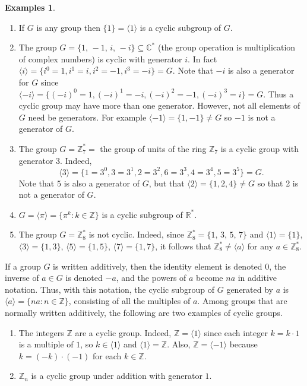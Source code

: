 \documentclass[11pt]{article}
\newcommand{\R}{\mathbb R}
\newcommand{\cm} {{\mathbb C}}
\newcommand{\Z} {{\mathbb Z}}
\newcommand{\<}{\ensuremath{\langle}}
\renewcommand{\>}{\ensuremath{\rangle}}
\theoremstyle{plain}
\theoremstyle{definition}
\newtheorem{exs}[thm]{Examples}
\begin{document}
\begin{exs}  \begin{enumerate}
\item If $G$ is any group  then
$\{1\} =\langle 1\rangle$ is a cyclic subgroup of $G$.

\item  The group $G=\{1,\, -1,\, i,\, -i\} \subseteq \cm^*$ (the
group operation  is multiplication of complex numbers) is cyclic
with generator $i$.  In fact $\langle i\rangle = \{i^0=1, i^1=i,
i^2=-1, i^3=-i\} = G$.  Note that $-i$ is also a generator for $G$
since $\langle -i\rangle =\{(-i)^0=1, (-i)^1=-i, (-i)^2=-1,
(-i)^3=i\}=G$.  Thus a cyclic group may have more than one
generator.  However, not all elements of $G$ need be generators.
For example $\langle -1\rangle = \{1, -1\}\ne G$ so $-1$ is not a
generator of $G$.

\item The group $G=\Z_7^*=$ the group of units of the ring $\Z_7$ is
a cyclic group with generator $3$.  Indeed,
$$\langle 3\rangle = \{ 1=3^0, 3=3^1, 2=3^2, 6=3^3, 4=3^4, 5=3^5\}=G.$$
Note that $5$ is also a generator of $G$, but that
$\langle 2\rangle = \{1, 2, 4\}\ne G$ so that 2 is not a generator of $G$.

\item  $G=\langle \pi\rangle =\{\pi^k:k\in \Z\}$ is a cyclic
subgroup of $\R^*$.

\item  The group $G=\Z_8^*$ is not cyclic.  Indeed, since
$\Z_8^*=\{1, \, 3,\, 5,\,7\}$ and $\langle 1\rangle = \{1\}$,
$\langle 3\rangle = \{1, 3\}$, $\langle 5\rangle=\{1, 5\}$,
$\langle 7\rangle =\{1, 7\}$, it follows that $\Z_8^*\ne \langle
a\rangle$ for any $a\in \Z_8^*$.
\end{enumerate}
\medskip
If a group $G$ is written additively, then the identity
element is denoted $0$,   the inverse of $a\in G$ is denoted $-a$,
and the powers of $a$ become $na$ in additive notation.  Thus,
with this notation, the cyclic subgroup of $G$ generated by $a$ is
$\langle a \rangle = \{na: n\in \Z\}$, consisting of all the
multiples of $a$. Among groups that are normally written
additively, the following are two examples of cyclic groups.
\begin{enumerate}
\addtocounter{enumi}{5} \item  The integers $\Z$ are a cyclic
group. Indeed, $\Z=\langle 1\rangle$ since each integer $k=k\cdot
1$ is a multiple of $1$, so $k\in \langle 1\rangle$ and $\langle
1\rangle =\Z$.  Also, $\Z=\langle -1\rangle$ because $k=(-k)\cdot
(-1)$ for each $k\in \Z$.

\item  $\Z_n$ is a cyclic group under addition with generator $1$.
\end{enumerate}
\end{exs}
\end{document}
